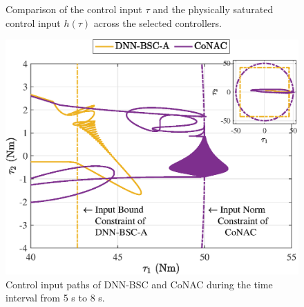 \documentclass[lettersize,journal]{IEEEtran}
\begin{document}
\begin{figure}[!t]
    \centering
    \hfill
    \vfill
    \hfill
    \caption{Comparison of the control input $\tau$ and the physically saturated control input $h(\tau)$ across the selected controllers.}
    \label{fig: control}
\end{figure}

\begin{figure}[!t]
    \centering
    {\includegraphics[width=0.9\linewidth]{fig/fig16.eps}
    \caption{Control input paths of DNN-BSC and CoNAC during the time interval from 5 s to 8 s.}
    \label{fig: ball control}}
\end{figure}
\end{document}
